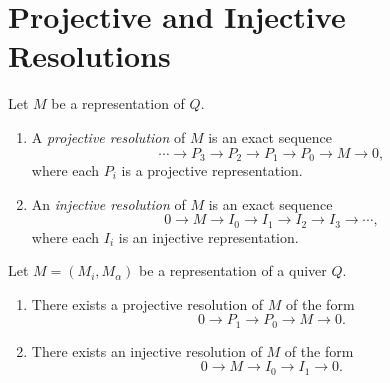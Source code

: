 \documentclass[11pt, a4paper]{report}
\begin{document}
\section{Projective and Injective Resolutions}

\begin{definition}
    Let $M$ be a representation of $Q$.
    \begin{enumerate}
        \item A \emph{projective resolution} of $M$ is an exact sequence
        \[
            \cdots \longrightarrow P_3 \longrightarrow P_2 \longrightarrow P_1 \longrightarrow P_0 \longrightarrow M \longrightarrow 0,
        \]
        where each $P_i$ is a projective representation.

        \item An \emph{injective resolution} of $M$ is an exact sequence
        \[
            0 \longrightarrow M \longrightarrow I_0 \longrightarrow I_1 \longrightarrow I_2 \longrightarrow I_3 \longrightarrow \cdots,
        \]
        where each $I_i$ is an injective representation.
    \end{enumerate}
\end{definition}

\begin{theorem}\label{thm:projective-injective-resolution-length-one}
    Let $M=(M_i,M_\alpha)$ be a representation of a quiver $Q$.
    \begin{enumerate}
        \item There exists a projective resolution of $M$ of the form
        \[
            0 \longrightarrow P_1 \longrightarrow P_0 \longrightarrow M \longrightarrow 0.
        \]

        \item There exists an injective resolution of $M$ of the form
        \[
            0 \longrightarrow M \longrightarrow I_0 \longrightarrow I_1 \longrightarrow 0.
        \]
    \end{enumerate}
    \end{theorem}
\end{document}
